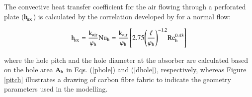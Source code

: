%
%
%
%
%
%
%

The convective heat transfer coefficient for the air flowing through a perforated plate ($\rm{h_{\!_{HX}}}$) is calculated by the correlation developed by \citet{Kutscher1994} for a normal flow:

\vspace{-0.75cm}
\begin{equation}
\mathrm{{h_{\!_{HX}}} = \frac{{{k_{air}}}}{{{\varphi_h}}}Nu_{h} = \frac{{{k_{air}}}}{{{\varphi_h}}}\left[ {2.75{{\left( {\frac{\ell }{{{\varphi_h}}}} \right)}^{ - 1.2}}{\rm{Re}}_{h}^{0.43}} \right]}
\label{convectionholes}
\end{equation}

\noindent where the hole pitch and the hole diameter at the absorber are calculated based on the hole area $\rm{A_h}$ in Eqs. (\ref{phole}) and (\ref{dhole}), respectively, whereas Figure \ref{pitch} illustrates a drawing of carbon fibre fabric to indicate the geometry parameters used in the modelling. 

